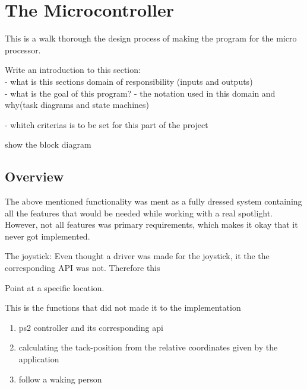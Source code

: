 
\section{The Microcontroller}
\label{sec:TheMicrocontroller}

This is a walk thorough the design process of making the program for the micro processor.

Write an introduction to this section:\\
- what is this sections domain of responsibility (inputs and outputs)\\
- what is the goal of this program?
- the notation used in this domain and why(task diagrams and state machines)

- whitch criterias is to be set for this part of the project


show the block diagram















\subsection{Overview}
The above mentioned functionality was ment as a fully dressed system containing all the features that would be needed while working with a real spotlight. However, not all features was primary requirements, which makes it okay that it never got implemented. 
 
The joystick: Even thought a driver was made for the joystick, it the the corresponding API was not. Therefore this 

Point at a specific location. 

This is the functions that did not made it to the implementation

\begin{enumerate}[noitemsep]
	
	\item ps2 controller and its corresponding api
	
	\item calculating the tack-position from the relative coordinates given by the application  
	
	\item follow a waking person
	

\end{enumerate}






